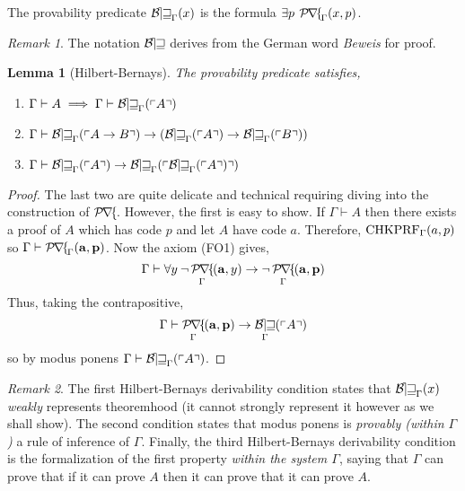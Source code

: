 \documentclass[12pt, leqno]{article}
\renewcommand{\bf}[1]{\mathbf{#1}}
\newcommand{\proves}{\vdash}
\newcommand{\uq}[1]{\forall{#1} \:}
\newcommand{\eq}[1]{\exists{#1} \:}
\newenvironment{definition}[1][Definition:]{\begin{trivlist}
\item[\hskip \labelsep {\bfseries #1}]}{\end{trivlist}}
\theoremstyle{theorem}
\newtheorem{lemma}[theorem]{Lemma}
\theoremstyle{definition}
\theoremstyle{definition}
\theoremstyle{remark}
\theoremstyle{definition}
\theoremstyle{remark}
\newtheorem{remark}{Remark}[subsection]
\DeclareMathOperator{\Prf}{\mathcal{P\mkern-2mu r\mkern-2.5mu f\mkern-2mu}}
\DeclareMathOperator{\Bew}{\mathcal{B\mkern-2.0mu e\mkern-2.0mu w\mkern-1mu}}
\begin{document}
\begin{definition}
The provability predicate $\Bew_\Gamma(x)$ is the formula $\eq{p}\Prf_{\Gamma}(x, p)$.
\end{definition}

\begin{remark}
The notation $\Bew$ derives from the German word \textit{Beweis} for proof. 
\end{remark}

\newcommand{\Thm}[1]{\Bew_{\Gamma}(\Gterm{#1})}
\newcommand{\G}{\mathcal{G}}

\begin{lemma}[Hilbert-Bernays]
The provability predicate satisfies,
\begin{enumerate}
\item $\Gamma \proves A \implies \Gamma \proves \Thm{A}$ 
\item $\Gamma \proves \Thm{A \to B} \to (\Thm{A} \to \Thm{B})$
\item $\Gamma \proves \Thm{A} \to \Thm{\Thm{A}}$
\end{enumerate}
\end{lemma}

\begin{proof}
The last two are quite delicate and technical requiring diving into the construction of $\Prf$. However, the first is easy to show. If $\Gamma \proves A$ then there exists a proof of $A$ which has code $p$ and let $A$ have code $a$. Therefore, $\mathrm{CHKPRF}_{\Gamma}(a,p)$ so $\Gamma \proves \Prf_{\Gamma}(\bf{a}, \bf{p})$. Now the axiom (FO1) gives, 
\[ \Gamma \proves \uq{y} \neg \Prf_{\Gamma}(\bf{a}, y) \to \neg \Prf_{\Gamma}(\bf{a}, \bf{p}) \] 
Thus, taking the contrapositive, 
\[ \Gamma \proves \Prf_{\Gamma}(\bf{a}, \bf{p}) \to \Thm{A} \]
so by modus ponens $\Gamma \proves \Thm{A}$. 
\end{proof}

\begin{remark}
The first Hilbert-Bernays derivability condition states that $\Bew_{\Gamma}(x)$ \textit{weakly} represents theoremhood (it cannot strongly represent it however as we shall show). The second condition states that modus ponens is \textit{provably (within $\Gamma$)} a rule of inference of $\Gamma$. Finally, the third Hilbert-Bernays derivability condition is the formalization of the first property \textit{within the system $\Gamma$}, saying that $\Gamma$ can prove that if it can prove $A$ then it can prove that it can prove $A$.  
\end{remark}
\end{document}
